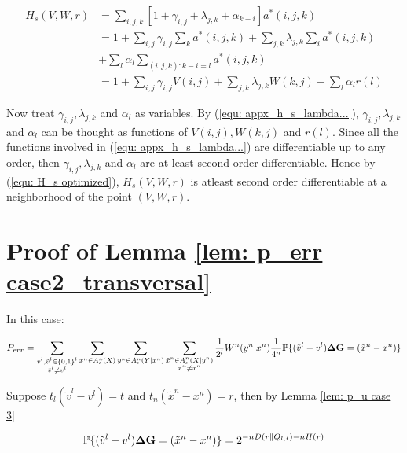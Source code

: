 \begin{align}\nonumber
H_{s}(V,W,r)&= \sum_{i,j,k}[1+ \gamma_{i,j} +\lambda_{j,k}+\alpha_{k-i}]a^*(i,j,k)\\\nonumber
&=1+\sum_{i,j} \gamma_{i,j}\sum_k a^*(i,j,k)+\sum_{j,k} \lambda_{j,k} \sum_i a^*(i,j,k)\\\nonumber
&+\sum_l \alpha_l \sum_{(i,j,k): k-i=l} a^*(i,j,k)\\\label{equ: H_s optimized}
&=1+\sum_{i,j} \gamma_{i,j}V(i,j)+\sum_{j,k} \lambda_{j,k}W(k,j)+\sum_l \alpha_l r(l)
\end{align}

Now treat $\gamma_{i,j}, \lambda_{j,k}$ and $\alpha_l$ as variables. By (\ref{equ: appx_h_s_lambda...}), $\gamma_{i,j}, \lambda_{j,k}$ and $\alpha_l$ can be thought as functions of  $V(i,j),W(k,j)$ and $r(l)$. Since all the functions involved in (\ref{equ: appx_h_s_lambda...}) are differentiable up to any order, then  $\gamma_{i,j}, \lambda_{j,k}$ and $\alpha_l$ are at least second order differentiable. Hence  by (\ref{equ: H_s optimized}), $H_{s}(V,W,r)$ is atleast second order differentiable at a neighborhood of the point $(V,W,r)$.













\section{Proof of Lemma \ref{lem: p_err case2_transversal} } \label{sec: proof of case 2}

In this case:

\begin{align}
P_{err}=\sum_{\substack{v^l, \tilde{v}^l \in \{0, 1\}^l\\ \tilde{v}^l \neq v^l}}  \sum_{x^n\in A_\epsilon^n(X)} \sum_{y^n\in A_\epsilon^n(Y|x^n)}\sum_{\substack{\tilde{x}^n\in A_\epsilon^n(X|y^n) \\ \tilde{x}^n\neq x^n}} \frac{1}{2^l} W^n(y^n|x^n) \frac{1}{4^n}\mathbb{P}\{ (\tilde{v}^l-v^l)\mathbf{\Delta G}=(\tilde{x}^n-x^n)\}
\end{align} 

Suppose $t_l(\tilde{v}^l-v^l)=t$ and $t_n(\tilde{x}^n-x^n)=r$, then by Lemma \ref{lem: p_u case 3}

\begin{equation*}
\mathbb{P}\{ (\tilde{v}^l-v^l)\mathbf{\Delta G}=(\tilde{x}^n-x^n)\}=2^{-nD(r\| Q_{l,t})-nH(r)}
\end{equation*}

